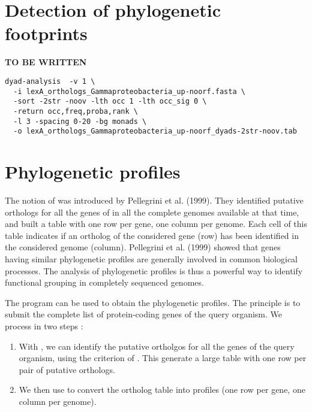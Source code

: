 \section{Detection of phylogenetic footprints}

\textbf{TO BE WRITTEN}

\begin{footnotesize}
\begin{verbatim}
dyad-analysis  -v 1 \
  -i lexA_orthologs_Gammaproteobacteria_up-noorf.fasta \
  -sort -2str -noov -lth occ 1 -lth occ_sig 0 \
  -return occ,freq,proba,rank \
  -l 3 -spacing 0-20 -bg monads \
  -o lexA_orthologs_Gammaproteobacteria_up-noorf_dyads-2str-noov.tab
\end{verbatim}
\end{footnotesize}

\section{Phylogenetic profiles}

The notion of  was introduced by
Pellegrini et al. (1999). They identified putative orthologs for all
the genes of  in all the complete genomes
available at that time, and built a table with one row per gene, one
column per genome. Each cell of this table indicates if an ortholog of
the considered gene (row) has been identified in the considered genome
(column). Pellegrini et al. (1999) showed that genes having similar
phylogenetic profiles are generally involved in common biological
processes. The analysis of phylogenetic profiles is thus a powerful
way to identify functional grouping in completely sequenced genomes.

The program  can be used to obtain the
phylogenetic profiles. The principle is to submit the complete list of
protein-coding genes of the query organism. We process in two steps : 

\begin{enumerate}

\item With \program{get-orthologs}, we can identify the putative
  ortholgos for all the genes of the query organism, using the
  criterion of . This generate a
  large table with one row per pair of putative orthologs.

\item We then use \program{convert-classes} to convert the ortholog
  table into profiles (one row per gene, one column per genome).

\end{enumerate}

